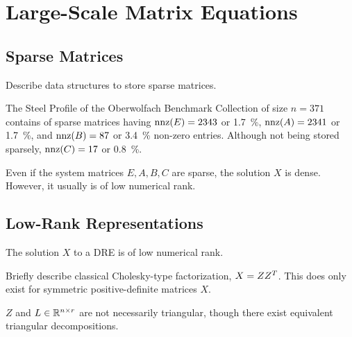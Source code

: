 \chapter{Large-Scale Matrix Equations}

\section{Sparse Matrices}
Describe data structures to store sparse matrices.

\begin{example}
  The Steel Profile of the Oberwolfach Benchmark Collection of size $n=371$
  contains of sparse matrices having
  $\operatorname{nnz}(E) = 2343$ or \SI{1.7}{\percent},
  $\operatorname{nnz}(A) = 2341$ or \SI{1.7}{\percent}, and
  $\operatorname{nnz}(B) = 87$ or \SI{3.4}{\percent} non-zero entries.
  Although not being stored sparsely, $\operatorname{nnz}(C) = 17$ or \SI{0.8}{\percent}.
\end{example}

Even if the system matrices $E, A, B, C$ are sparse,
the solution $X$ is dense.
However, it usually is of low numerical rank.

\section{Low-Rank Representations}

\begin{theorem}
\label{thm:lowrank}
The solution $X$ to a \ac{DRE} is of low numerical rank.
\end{theorem}

Briefly describe classical Cholesky-type factorization, $X=ZZ^T$.
This does only exist for symmetric positive-definite matrices $X$.


$Z$ and $L \in \mathbb{R}^{n\times r}$ are not necessarily triangular,
though there exist equivalent triangular decompositions.

